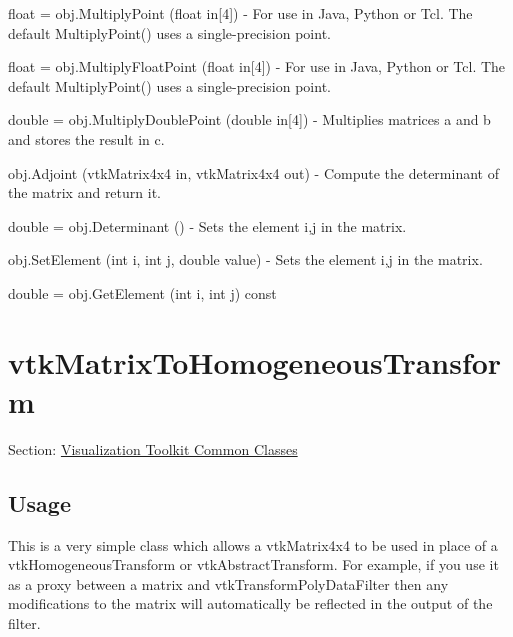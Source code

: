 \begin{DoxyItemize}
\item {\ttfamily float = obj.\-Multiply\-Point (float in\mbox{[}4\mbox{]})} -\/ For use in Java, Python or Tcl. The default Multiply\-Point() uses a single-\/precision point.  
\item {\ttfamily float = obj.\-Multiply\-Float\-Point (float in\mbox{[}4\mbox{]})} -\/ For use in Java, Python or Tcl. The default Multiply\-Point() uses a single-\/precision point.  
\item {\ttfamily double = obj.\-Multiply\-Double\-Point (double in\mbox{[}4\mbox{]})} -\/ Multiplies matrices a and b and stores the result in c.  
\item {\ttfamily obj.\-Adjoint (vtk\-Matrix4x4 in, vtk\-Matrix4x4 out)} -\/ Compute the determinant of the matrix and return it.  
\item {\ttfamily double = obj.\-Determinant ()} -\/ Sets the element i,j in the matrix.  
\item {\ttfamily obj.\-Set\-Element (int i, int j, double value)} -\/ Sets the element i,j in the matrix.  
\item {\ttfamily double = obj.\-Get\-Element (int i, int j) const}  
\end{DoxyItemize}\hypertarget{vtkcommon_vtkmatrixtohomogeneoustransform}{}\section{vtk\-Matrix\-To\-Homogeneous\-Transform}\label{vtkcommon_vtkmatrixtohomogeneoustransform}
Section\-: \hyperlink{sec_vtkcommon}{Visualization Toolkit Common Classes} \hypertarget{vtkwidgets_vtkxyplotwidget_Usage}{}\subsection{Usage}\label{vtkwidgets_vtkxyplotwidget_Usage}
This is a very simple class which allows a vtk\-Matrix4x4 to be used in place of a vtk\-Homogeneous\-Transform or vtk\-Abstract\-Transform. For example, if you use it as a proxy between a matrix and vtk\-Transform\-Poly\-Data\-Filter then any modifications to the matrix will automatically be reflected in the output of the filter.

